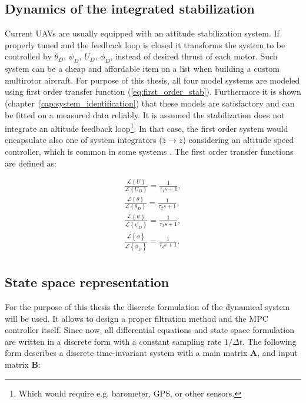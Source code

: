 \subsection{Dynamics of the integrated stabilization}

Current UAVs are usually equipped with an attitude stabilization system. If properly tuned and the feedback loop is closed it transforms the system to be controlled by $\theta_D$, $\psi_D$, $U_D$, $\dot{\phi_D}$, instead of desired thrust of each motor. Such system can be a cheap and affordable item on a list when building a custom multirotor aircraft. For purpose of this thesis, all four model systems are modeled using first order transfer function (\ref{eq:first_order_stab}). Furthermore it is shown (chapter~\ref{cap:system_identification}) that these models are satisfactory and can be fitted on a measured data reliably. It is assumed the stabilization does not integrate an altitude feedback loop\footnote{Which would require e.g. barometer, GPS, or other sensors.}. In that case, the first order system would encapsulate also one of system integrators ($\ddot{z} \rightarrow \dot{z}$) considering an altitude speed controller, which is common in some systems \citep{pixhawk, ardupilot}. The first order transfer functions are defined as:

\begin{equation}
\begin{split}
\frac{\mathcal{L}\left\lbrace U \right\rbrace}{\mathcal{L}\left\lbrace U_D \right\rbrace} = \frac{1}{\tau_1 s + 1},\\
\frac{\mathcal{L}\left\lbrace \theta \right\rbrace}{\mathcal{L}\left\lbrace \theta_D \right\rbrace} = \frac{1}{\tau_2 s + 1},\\
\frac{\mathcal{L}\left\lbrace \psi \right\rbrace}{\mathcal{L}\left\lbrace \psi_D \right\rbrace} = \frac{1}{\tau_3 s + 1},\\
\frac{\mathcal{L}\left\lbrace \dot{\phi} \right\rbrace}{\mathcal{L}\left\lbrace \dot{\phi}_D \right\rbrace} = \frac{1}{\tau_4 s + 1}.\\
\end{split}
\label{eq:first_order_stab}
\end{equation}

\subsection{State space representation}

For the purpose of this thesis the discrete formulation of the dynamical system will be used. It allows to design a proper filtration method and the MPC controller itself. Since now, all differential equations and state space formulation are written in a discrete form with a constant sampling rate $1/\Delta t$. The following form describes a discrete time-invariant system with a main matrix $\mathbf{A}$, and input matrix $\mathbf{B}$:

